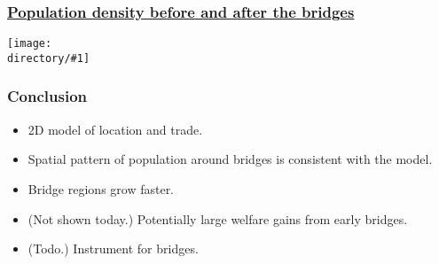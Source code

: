 \documentclass[compress,mathserif]{beamer}
\newcommand{\directory}{exhibits}
\newcommand{\widefigure}[2]{\begin{frame}\frametitle{\hyperlink{#1back}{#2}}\hypertarget{#1}{{\begin{center}\texttt{[image: \\directory/\#1]}\end{center}}}\end{frame}}
\begin{document}
\widefigure{regressions}{Population density before and after the bridges}

\begin{frame}\frametitle{Conclusion}

\begin{itemize}
\item 2D model of location and trade.
\item Spatial pattern of population around bridges is consistent with the model.
\item Bridge regions grow faster.
\item (Not shown today.) Potentially large welfare gains from early bridges.
\item (Todo.) Instrument for bridges.
\end{itemize}

\end{frame}
\end{document}
